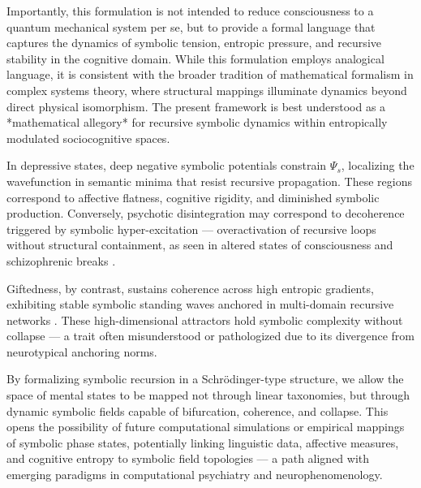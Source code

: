 Importantly, this formulation is not intended to reduce consciousness to a quantum mechanical system per se, but to provide a formal language that captures the dynamics of symbolic tension, entropic pressure, and recursive stability in the cognitive domain. While this formulation employs analogical language, it is consistent with the broader tradition of mathematical formalism in complex systems theory, where structural mappings illuminate dynamics beyond direct physical isomorphism. The present framework is best understood as a *mathematical allegory* for recursive symbolic dynamics within entropically modulated sociocognitive spaces.

In depressive states, deep negative symbolic potentials constrain \( \Psi_s \), localizing the wavefunction in semantic minima that resist recursive propagation. These regions correspond to affective flatness, cognitive rigidity, and diminished symbolic production. Conversely, psychotic disintegration may correspond to decoherence triggered by symbolic hyper-excitation — overactivation of recursive loops without structural containment, as seen in altered states of consciousness and schizophrenic breaks \cite{carhart2014, tagliazucchi2016}.

Giftedness, by contrast, sustains coherence across high entropic gradients, exhibiting stable symbolic standing waves anchored in multi-domain recursive networks \cite{silverman2009, rinn2012}. These high-dimensional attractors hold symbolic complexity without collapse — a trait often misunderstood or pathologized due to its divergence from neurotypical anchoring norms.

By formalizing symbolic recursion in a Schrödinger-type structure, we allow the space of mental states to be mapped not through linear taxonomies, but through dynamic symbolic fields capable of bifurcation, coherence, and collapse. This opens the possibility of future computational simulations or empirical mappings of symbolic phase states, potentially linking linguistic data, affective measures, and cognitive entropy to symbolic field topologies — a path aligned with emerging paradigms in computational psychiatry and neurophenomenology.
